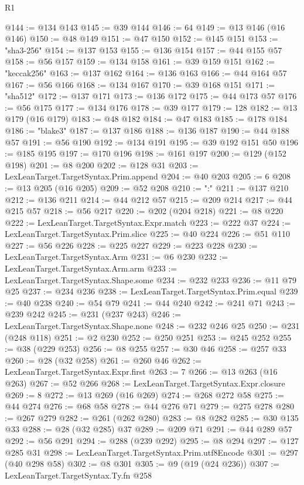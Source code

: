 \begin{lexlean}{R1}
\begin{coremodule}
{{{{{{{{{{{{{{{{{{{{{{{@144 := @134 @143
@145 := @39 @144
@146 := 64
@149 := @13 @146 (@16 @146)
@150 := @48 @149
@151 := @47 @150
@152 := @145 @151
@153 := "sha3-256"
@154 := @137 @153
@155 := @136 @154
@157 := @44 @155 @57
@158 := @56 @157
@159 := @134 @158
@161 := @39 @159 @151
@162 := "keccak256"
@163 := @137 @162
@164 := @136 @163
@166 := @44 @164 @57
@167 := @56 @166
@168 := @134 @167
@170 := @39 @168 @151
@171 := "sha512"
@172 := @137 @171
@173 := @136 @172
@175 := @44 @173 @57
@176 := @56 @175
@177 := @134 @176
@178 := @39 @177
@179 := 128
@182 := @13 @179 (@16 @179)
@183 := @48 @182
@184 := @47 @183
@185 := @178 @184
@186 := "blake3"
@187 := @137 @186
@188 := @136 @187
@190 := @44 @188 @57
@191 := @56 @190
@192 := @134 @191
@195 := @39 @192 @151 @50
@196 := @185 @195
@197 := @170 @196
@198 := @161 @197
@200 := @129 (@152 @198)
@201 := @8 @200
@202 := @128 @31
@203 := LexLeanTarget.TargetSyntax.Prim.append
@204 := @40 @203
@205 := 6
@208 := @13 @205 (@16 @205)
@209 := @52 @208
@210 := ":"
@211 := @137 @210
@212 := @136 @211
@214 := @44 @212 @57
@215 := @209 @214
@217 := @44 @215 @57
@218 := @56 @217
@220 := @202 (@204 @218)
@221 := @8 @220
@222 := LexLeanTarget.TargetSyntax.Expr.match
@223 := @222 @37
@224 := LexLeanTarget.TargetSyntax.Prim.slice
@225 := @40 @224
@226 := @51 @110
@227 := @56 @226
@228 := @225 @227
@229 := @223 @228
@230 := LexLeanTarget.TargetSyntax.Arm
@231 := @6 @230
@232 := LexLeanTarget.TargetSyntax.Arm.arm
@233 := LexLeanTarget.TargetSyntax.Shape.some
@234 := @232 @233
@236 := @11 @79 @25
@237 := @234 @236
@238 := LexLeanTarget.TargetSyntax.Prim.equal
@239 := @40 @238
@240 := @54 @79
@241 := @44 @240
@242 := @241 @71
@243 := @239 @242
@245 := @231 (@237 @243)
@246 := LexLeanTarget.TargetSyntax.Shape.none
@248 := @232 @246 @25
@250 := @231 (@248 @118)
@251 := @2 @230
@252 := @250 @251
@253 := @245 @252
@255 := @38 (@229 @253)
@256 := @8 @255
@257 := @30 @46
@258 := @257 @33
@260 := @28 (@32 @258)
@261 := @260 @46
@262 := LexLeanTarget.TargetSyntax.Expr.first
@263 := 7
@266 := @13 @263 (@16 @263)
@267 := @52 @266
@268 := LexLeanTarget.TargetSyntax.Expr.closure
@269 := 8
@272 := @13 @269 (@16 @269)
@274 := @268 @272 @58
@275 := @44 @274
@276 := @68 @58
@278 := @44 @276 @71
@279 := @275 @278
@280 := @267 @279
@282 := @261 (@262 @280)
@283 := @8 @282
@285 := @30 @135 @33
@288 := @28 (@32 @285) @37
@289 := @209 @71
@291 := @44 @289 @57
@292 := @56 @291
@294 := @288 (@239 @292)
@295 := @8 @294
@297 := @127 @285 @31
@298 := LexLeanTarget.TargetSyntax.Prim.utf8Encode
@301 := @297 (@40 @298 @58)
@302 := @8 @301
@305 := @9 (@19 (@24 @236))
@307 := LexLeanTarget.TargetSyntax.Ty.fn @258
}}}}}}}}}}}}}}}}}}}}}}}
\end{coremodule}
\end{lexlean}
